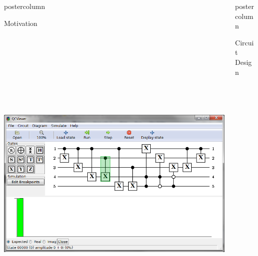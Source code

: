 \documentclass[final]{beamer} %
\begin{document}
\begin{frame}{}
\begin{columns}
\begin{column}{.33\textwidth}
\begin{beamercolorbox}[center,wd=\textwidth]{postercolumn}
\begin{minipage}[c][0.95\textheight][s]{0.95\columnwidth}
\begin{block}{\large Motivation}
\begin{center}
                    \includegraphics[height=6.20in]{figures/Motivation.png}
                \end{center}
            \end{block}
        \end{minipage}
        \end{beamercolorbox}
        \end{column}

        \begin{column}{.33\textwidth}
        \begin{beamercolorbox}[center,wd=\textwidth]{postercolumn}
        \begin{minipage}[c][0.95\textheight][s]{0.95\columnwidth}
            \begin{block}{\large Circuit Design}


\end{block}
\end{minipage}
\end{beamercolorbox}
\end{column}
\end{columns}
\end{frame}
\end{document}
